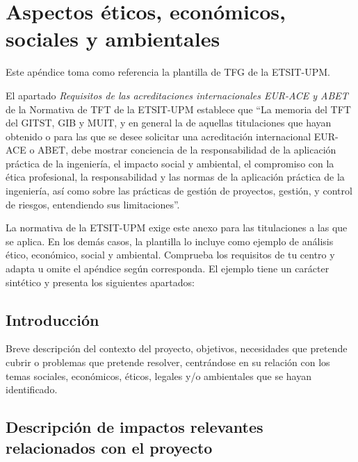 %
%

\chapter{Aspectos éticos, económicos, sociales y ambientales}
\label{cha:aspectos-eticos}

Este apéndice toma como referencia la plantilla de TFG de la ETSIT-UPM.

El apartado \emph{Requisitos de las acreditaciones internacionales EUR-ACE y ABET} de la Normativa de TFT de la ETSIT-UPM establece que ``La memoria del TFT del GITST, GIB y MUIT, y en general la de aquellas titulaciones que hayan obtenido o para las que se desee solicitar una acreditación internacional EUR-ACE o ABET, debe mostrar conciencia de la responsabilidad de la aplicación práctica de la ingeniería, el impacto social y ambiental, el compromiso con la ética profesional, la responsabilidad y las normas de la aplicación práctica de la ingeniería, así como sobre las prácticas de gestión de proyectos, gestión, y control de riesgos, entendiendo sus limitaciones''.

La normativa de la ETSIT-UPM exige este anexo para las titulaciones a las que se aplica. En los demás casos, la plantilla lo incluye como ejemplo de análisis ético, económico, social y ambiental. Comprueba los requisitos de tu centro y adapta u omite el apéndice según corresponda. El ejemplo tiene un carácter sintético y presenta los siguientes apartados:

\section{Introducción}
\label{sec:aspectos-eticos-introduccion}

Breve descripción del contexto del proyecto, objetivos, necesidades que pretende cubrir o problemas que pretende resolver, centrándose en su relación con los temas sociales, económicos, éticos, legales y/o ambientales que se hayan identificado.

\section{Descripción de impactos relevantes relacionados con el proyecto}
\label{sec:aspectos-eticos-impactos}

